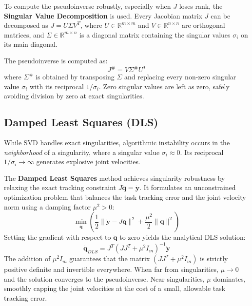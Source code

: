 To compute the pseudoinverse robustly, especially when $J$ loses rank, the \textbf{Singular Value Decomposition} is used. 
Every Jacobian matrix $J$ can be decomposed as $J = U \Sigma V^T$, where $U \in \mathbb{R}^{m \times m}$ and $V \in \mathbb{R}^{n \times n}$ 
are orthogonal matrices, and $\Sigma \in \mathbb{R}^{m \times n}$ is a diagonal matrix containing the singular values $\sigma_i$ on its main diagonal.

The pseudoinverse is computed as:
\begin{equation}
    J^\# = V \Sigma^\# U^T
\end{equation}
where $\Sigma^\#$ is obtained by transposing $\Sigma$ 
and replacing every non-zero singular value $\sigma_i$ with its reciprocal $1/\sigma_i$. 
Zero singular values are left as zero, safely avoiding division by zero at exact singularities.

\subsection{Damped Least Squares (DLS)}
\label{sec:DLS}

While SVD handles exact singularities, algorithmic instability occurs in the \textit{neighborhood} of a 
singularity, where a singular value $\sigma_i \approx 0$. Its reciprocal $1/\sigma_i \to \infty$ generates explosive joint velocities.

The \textbf{Damped Least Squares} method achieves singularity robustness by relaxing the exact tracking 
constraint $J\dot{\mathbf{q}} = \dot{\mathbf{y}}$. It formulates an unconstrained optimization problem that 
balances the task tracking error and the joint velocity norm using a damping factor $\mu^2 > 0$:
\begin{equation}
    \min_{\dot{\mathbf{q}}} \left( \frac{1}{2} \|\dot{\mathbf{y}} - J\dot{\mathbf{q}}\|^2 + \frac{\mu^2}{2} \|\dot{\mathbf{q}}\|^2 \right)
\end{equation}
Setting the gradient with respect to $\dot{\mathbf{q}}$ to zero yields the analytical DLS solution:
\begin{equation}
    \dot{\mathbf{q}}_{DLS} = J^T(J J^T + \mu^2 I_m)^{-1} \dot{\mathbf{y}}
\end{equation}
The addition of $\mu^2 I_m$ guarantees that the matrix $(J J^T + \mu^2 I_m)$ is 
strictly positive definite and invertible everywhere. When far from singularities, 
$\mu \to 0$ and the solution converges to the pseudoinverse. Near singularities, $\mu$ dominates, 
smoothly capping the joint velocities at the cost of a small, allowable task tracking error.